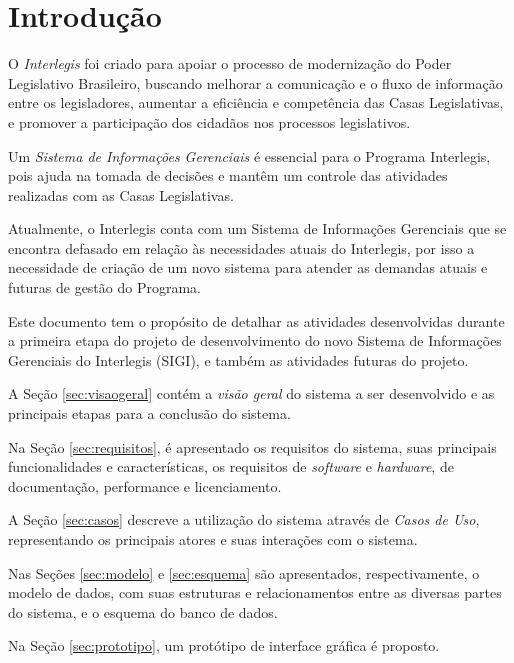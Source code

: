 %
%

\section{Introdução}
O \emph{Interlegis} foi criado para apoiar o processo de modernização
do Poder Legislativo Brasileiro, buscando melhorar a comunicação e o
fluxo de informação entre os legisladores, aumentar a eficiência e
competência das Casas Legislativas, e promover a participação dos
cidadãos nos processos legislativos.

Um \emph{Sistema de Informações Gerenciais} é essencial para o
Programa Interlegis, pois ajuda na tomada de decisões e mantêm um
controle das atividades realizadas com as Casas Legislativas.

Atualmente, o Interlegis conta com um Sistema de Informações
Gerenciais que se encontra defasado em relação às necessidades atuais
do Interlegis, por isso a necessidade de criação de um novo sistema
para atender as demandas atuais e futuras de gestão do Programa.

Este documento tem o propósito de detalhar as atividades desenvolvidas
durante a primeira etapa do projeto de desenvolvimento do novo Sistema
de Informações Gerenciais do Interlegis (SIGI), e também as atividades
futuras do projeto.

A Seção \ref{sec:visaogeral} contém a \emph{visão geral} do sistema a
ser desenvolvido e as principais etapas para a conclusão do sistema.

Na Seção \ref{sec:requisitos}, é apresentado os requisitos do sistema,
suas principais funcionalidades e características, os requisitos de
\textit{software} e \textit{hardware}, de documentação, performance e
licenciamento.

A Seção \ref{sec:casos} descreve a utilização do sistema através de
\emph{Casos de Uso}, representando os principais atores e suas
interações com o sistema.

Nas Seções \ref{sec:modelo} e \ref{sec:esquema} são apresentados,
respectivamente, o modelo de dados, com suas estruturas e
relacionamentos entre as diversas partes do sistema, e o esquema do
banco de dados.

Na Seção \ref{sec:prototipo}, um protótipo de interface gráfica é
proposto.


